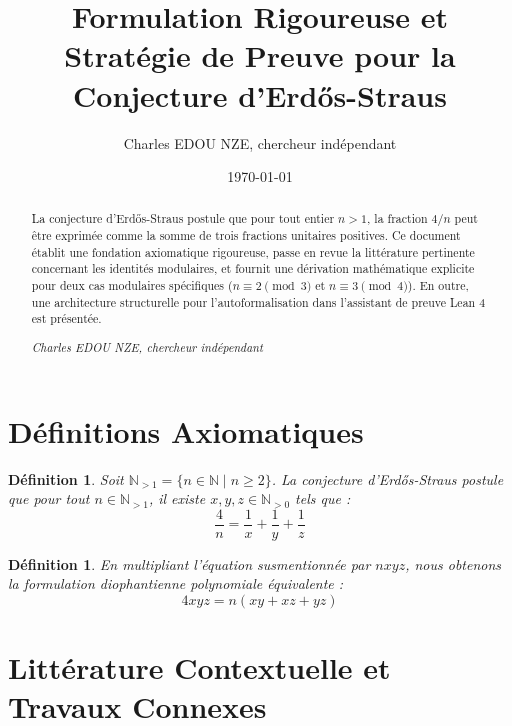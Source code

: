 \documentclass[11pt,a4paper]{article}
\title{Formulation Rigoureuse et Strat\'egie de Preuve pour la Conjecture d'Erd\H{o}s-Straus}
\author{Charles EDOU NZE, chercheur ind\'ependant}
\date{\today}
\newtheorem{definition}[theorem]{D\'efinition}
\begin{document}
\maketitle

\begin{abstract}
La conjecture d'Erd\H{o}s-Straus postule que pour tout entier $n > 1$, la fraction $4/n$ peut \^etre exprim\'ee comme la somme de trois fractions unitaires positives. Ce document \'etablit une fondation axiomatique rigoureuse, passe en revue la litt\'erature pertinente concernant les identit\'es modulaires, et fournit une d\'erivation math\'ematique explicite pour deux cas modulaires sp\'ecifiques ($n \equiv 2 \pmod 3$ et $n \equiv 3 \pmod 4$). En outre, une architecture structurelle pour l'autoformalisation dans l'assistant de preuve Lean 4 est pr\'esent\'ee.

\vspace{2cm}
\begin{flushright}
\textit{Charles EDOU NZE, chercheur ind\'ependant}
\end{flushright}
\end{abstract}

\newpage

\section{D\'efinitions Axiomatiques}

\begin{definition}
Soit $\mathbb{N}_{>1} = \{n \in \mathbb{N} \mid n \geq 2\}$. La conjecture d'Erd\H{o}s-Straus postule que pour tout $n \in \mathbb{N}_{>1}$, il existe $x, y, z \in \mathbb{N}_{>0}$ tels que :
\begin{equation}
\frac{4}{n} = \frac{1}{x} + \frac{1}{y} + \frac{1}{z}
\end{equation}
\end{definition}

\begin{definition}
En multipliant l'\'equation susmentionn\'ee par $n x y z$, nous obtenons la formulation diophantienne polynomiale \'equivalente :
\begin{equation}
4 x y z = n (x y + x z + y z)
\end{equation}
\end{definition}

\section{Litt\'erature Contextuelle et Travaux Connexes}
\end{document}
